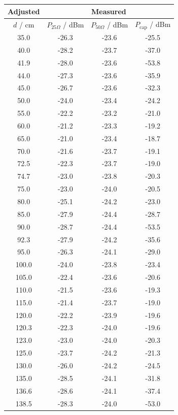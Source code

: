 \begin{table}[ht!]
	\centering
	\begin{tabular}{|c||c|c|c|}
		\hline
	    \textbf{Adjusted} & \multicolumn{3}{c|}{\textbf{Measured}} \\
		\hline
		$d$ / cm &
		$P_{25\Omega}$ / dBm &
		$P_{50\Omega}$ / dBm &
		$P_{\mathrm{cap}}$ / dBm \\
		\hline\hline
		35.0 & -26.3 & -23.6 & -25.5 \\
		40.0 & -28.2 & -23.7 & -37.0 \\
		41.9 & -28.0 & -23.6 & -53.8 \\
		44.0 & -27.3 & -23.6 & -35.9 \\
		45.0 & -26.7 & -23.6 & -32.3 \\
		50.0 & -24.0 & -23.4 & -24.2 \\
		55.0 & -22.2 & -23.2 & -21.0 \\
		60.0 & -21.2 & -23.3 & -19.2 \\
		65.0 & -21.0 & -23.4 & -18.7 \\
		70.0 & -21.6 & -23.7 & -19.1 \\
		72.5 & -22.3 & -23.7 & -19.0 \\
		74.7 & -23.0 & -23.8 & -20.3 \\
		75.0 & -23.0 & -24.0 & -20.5 \\
		80.0 & -25.1 & -24.2 & -23.0 \\
		85.0 & -27.9 & -24.4 & -28.7 \\
		90.0 & -28.7 & -24.4 & -53.5 \\
		92.3 & -27.9 & -24.2 & -35.6 \\
		95.0 & -26.3 & -24.1 & -29.0 \\
		100.0 & -24.0 & -23.8 & -23.4 \\
		105.0 & -22.4 & -23.6 & -20.6 \\
		110.0 & -21.5 & -23.6 & -19.3 \\
		115.0 & -21.4 & -23.7 & -19.0 \\
		120.0 & -22.2 & -23.9 & -19.6 \\
		120.3 & -22.3 & -24.0 & -19.6 \\
		123.0 & -23.0 & -24.0 & -20.3 \\
		125.0 & -23.7 & -24.2 & -21.3 \\
		130.0 & -26.0 & -24.2 & -24.5 \\
		135.0 & -28.5 & -24.1 & -31.8 \\
		136.6 & -28.6 & -24.1 & -37.4 \\
		138.5 & -28.3 & -24.0 & -53.0 \\

\end{tabular}
\end{table}
